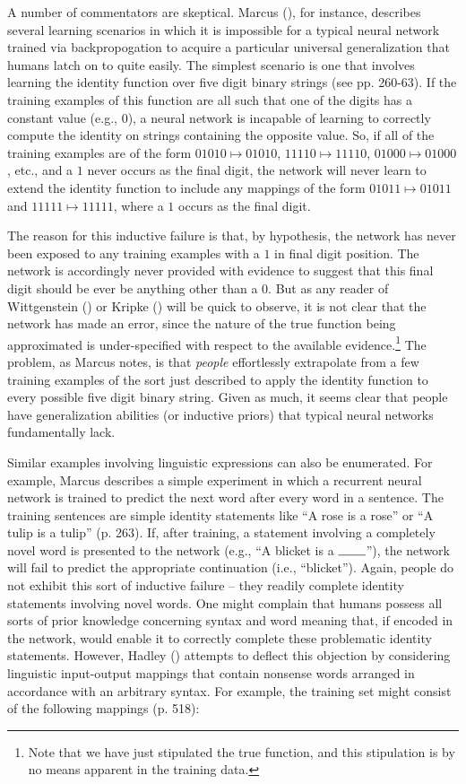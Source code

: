 A number of commentators are skeptical. Marcus (\citeyear{Marcus:1998}), for instance, describes several learning scenarios in which it is impossible for a typical neural network trained via backpropogation to acquire a particular universal generalization that humans latch on to quite easily. The simplest scenario is one that involves learning the identity function over five digit binary strings (see pp. 260-63). If the training examples of this function are all such that one of the digits has a constant value (e.g., $0$), a neural network is incapable of learning to correctly compute the identity on strings containing the opposite value. So, if all of the training examples are of the form $01010 \mapsto 01010$, $11110 \mapsto 11110$, $01000 \mapsto 01000$, etc., and a $1$ never occurs as the final digit, the network will never learn to extend the identity function to include any mappings of the form $01011 \mapsto 01011$ and $11111 \mapsto 11111$, where a $1$ occurs as the final digit. 

The reason for this inductive failure is that, by hypothesis, the network has never been exposed to any training examples with a $1$ in final digit position. The network is accordingly never provided with evidence to suggest that this final digit should be ever be anything other than a $0$. But as any reader of Wittgenstein (\citeyear{Wittgenstein:1953}) or Kripke (\citeyear{Kripke:1982}) will be quick to observe, it is not clear that the network has made an error, since the nature of the true function being approximated is under-specified with respect to the available evidence.\footnote{Note that we have just stipulated the true function, and this stipulation is by no means apparent in the training data.} The problem, as Marcus notes, is that \textit{people} effortlessly extrapolate from a few training examples of the sort just described to apply the identity function to every possible five digit binary string. Given as much, it seems clear that people have generalization abilities (or inductive priors) that typical neural networks fundamentally lack.

Similar examples involving linguistic expressions can also be enumerated. For example, Marcus describes a simple experiment in which a recurrent neural network is trained to predict the next word after every word in a sentence. The training sentences are simple identity statements like ``A rose is a rose'' or ``A tulip is a tulip'' (p. 263). If, after training, a statement involving a completely novel word is presented to the network (e.g., ``A blicket is a $\rule{0.75cm}{0.15mm}$''), the network will fail to predict the appropriate continuation (i.e., ``blicket''). Again, people do not exhibit this sort of inductive failure -- they readily complete identity statements involving novel words. One might complain that humans possess all sorts of prior knowledge concerning syntax and word meaning that, if encoded in the network, would enable it to correctly complete these problematic identity statements. However, Hadley (\citeyear{Hadley:2009}) attempts to deflect this objection by considering linguistic input-output mappings that contain nonsense words arranged in accordance with an arbitrary syntax. For example, the training set might consist of the following mappings (p. 518):

